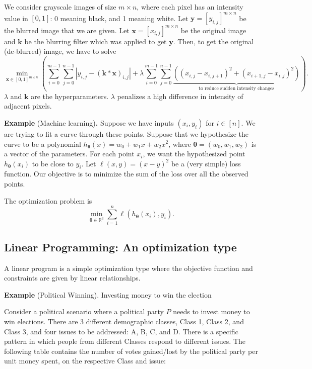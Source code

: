 \documentclass[twoside]{article}
\newcommand\R{\mathbb{R}}
\begin{document}
We consider grayscale images of size $m \times n$, where each pixel has an
intensity value in $[0, 1]$: 0 meaning black, and 1 meaning white.  Let
$\mathbf{y} = [y_{i, j}]^{m \times n}$ be the blurred image that we are given.
Let $\mathbf{x} = [x_{i, j}]^{m \times n}$ be the original image and
$\mathbf{k}$ be the blurring filter which was applied to get $\mathbf{y}$.
Then, to get the original (de-blurred) image, we have to solve \[
    \min_{\mathbf{x} \in [0, 1]^{m \times n}}
    \left(
        \sum_{i = 0}^{m - 1} \sum_{j = 0}^{n - 1}
            |y_{i, j} - (\mathbf{k} * \mathbf{x})_{i, j}|
        + \lambda \sum_{i = 0}^{m - 1} \sum_{j = 0}^{n - 1}
            \underbrace{
                \left((x_{i, j} - x_{i, j + 1})^2
                      + (x_{i + 1, j} - x_{i, j})^2\right)
            }_{
                \text{to reduce sudden intensity changes}
            }
    \right).
\] $\lambda$ and $\mathbf{k}$ are the hyperparameters. $\lambda$ penalizes a
high difference in intensity of adjacent pixels.

\textbf{Example} (Machine learning)\textbf{.} Suppose we have inputs
$(x_i, y_i)$ for $i \in [n].$ We are trying to fit a curve through these points.
Suppose that we hypothesize the curve to be a polynomial
$h_{\boldsymbol{\theta}}(x) = w_0 + w_1x + w_2x^2$, where
$\boldsymbol\theta = (w_0, w_1, w_2)$ is a vector of the parameters. For each
point $x_i$, we want the hypothesized point $h_{\boldsymbol{\theta}}(x_i)$ to be
close to $y_i$. Let $\ell(x, y) = (x - y)^2$ be a (very simple) loss function.
Our objective is to minimize the sum of the loss over all the observed points.

The optimization problem is \[
    \min_{\boldsymbol{\theta} \in \R^3}
        \sum_{i = 1}^{n} \ell(h_{\boldsymbol{\theta}}(x_i), y_i).
\]

\subsection{Linear Programming: An optimization type}
A linear program is a simple optimization type where the objective function and
constraints are given by linear relationships.

\textbf{Example} (Political Winning). Investing money to win the election

Consider a political scenario where a political party $P$ needs to invest money
to win elections. There are 3 different demographic classes, Class 1, Class 2,
and Class 3, and four issues to be addressed: A, B, C, and D. There is a
specific pattern in which people from different Classes respond to different
issues. The following table contains the number of votes gained/lost by the
political party per unit money spent, on the respective Class and issue:
\end{document}
